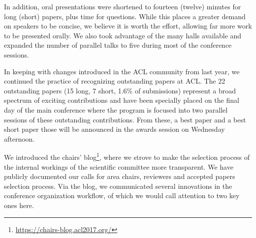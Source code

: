 In addition, oral presentations were shortened to fourteen (twelve)
minutes for long (short) papers, plus time for questions.  While this
places a greater demand on speakers to be concise, we believe it is
worth the effort, allowing far more work to be presented orally. We
also took advantage of the many halls available and expanded the
number of parallel talks to five during most of the conference
sessions.

In keeping with changes introduced in the ACL community from last
year, we continued the practice of recognizing outstanding papers at
ACL. The 22 outstanding papers (15 long, 7 short, 1.6\% of
submissions) represent a broad spectrum of exciting contributions and
have been specially placed on the final day of the main conference
where the program is focused into two parallel sessions of these
outstanding contributions. From these, a best paper and a best short
paper those will be announced in the awards session on Wednesday
afternoon.




We introduced the chairs'
blog\footnote{\url{https://chairs-blog.acl2017.org/}}, where we strove
to make the selection process of the internal workings of the
scientific committee more transparent.  We have publicly documented
our calls for area chairs, reviewers and accepted papers selection
process.  Via the blog, we communicated several innovations in the
conference organization workflow, of which we would call attention to
two key ones here.

